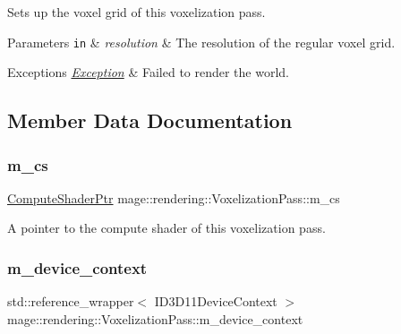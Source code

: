Sets up the voxel grid of this voxelization pass.


\begin{DoxyParams}[1]{Parameters}
\mbox{\tt in}  & {\em resolution} & The resolution of the regular voxel grid. \\
\hline
\end{DoxyParams}

\begin{DoxyExceptions}{Exceptions}
{\em \hyperlink{classmage_1_1_exception}{Exception}} & Failed to render the world. \\
\hline
\end{DoxyExceptions}


\subsection{Member Data Documentation}
\hypertarget{classmage_1_1rendering_1_1_voxelization_pass_ae3d844f54f0a3c1e2949b8cb38836eeb}{}\label{classmage_1_1rendering_1_1_voxelization_pass_ae3d844f54f0a3c1e2949b8cb38836eeb} 
\subsubsection{\texorpdfstring{m\+\_\+cs}{m\_cs}}
{\footnotesize\ttfamily \hyperlink{namespacemage_1_1rendering_ab3dc9f2114f2e9255b91d9c051da52ea}{Compute\+Shader\+Ptr} mage\+::rendering\+::\+Voxelization\+Pass\+::m\+\_\+cs\hspace{0.3cm}{\ttfamily [private]}}

A pointer to the compute shader of this voxelization pass. \hypertarget{classmage_1_1rendering_1_1_voxelization_pass_a44fc5652aed364651c7f58db658fc951}{}\label{classmage_1_1rendering_1_1_voxelization_pass_a44fc5652aed364651c7f58db658fc951} 
\subsubsection{\texorpdfstring{m\+\_\+device\+\_\+context}{m\_device\_context}}
{\footnotesize\ttfamily std\+::reference\+\_\+wrapper$<$ I\+D3\+D11\+Device\+Context $>$ mage\+::rendering\+::\+Voxelization\+Pass\+::m\+\_\+device\+\_\+context\hspace{0.3cm}{\ttfamily [private]}}

